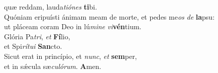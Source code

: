 \evenverse quæ reddam, lauda\textit{ti}\textit{ó}\textit{nes} \textbf{ti}bi.\\
\oddverse Quóniam eripuísti ánimam meam de morte, et pedes me\textit{os} \textit{de} \textbf{la}psu:~\*\\
\oddverse ut pláceam coram Deo in lú\textit{mi}\textit{ne} \textit{vi}\textbf{vén}tium.\\
\evenverse Glória Pa\textit{tri}, \textit{et} \textbf{Fí}lio,~\*\\
\evenverse et Spi\textit{rí}\textit{tu}\textit{i} \textbf{San}cto.\\
\oddverse Sicut erat in princípio, et \textit{nunc}, \textit{et} \textbf{sem}per,~\*\\
\oddverse et in sǽcula sæ\textit{cu}\textit{ló}\textit{rum}. \textbf{A}men.\\
